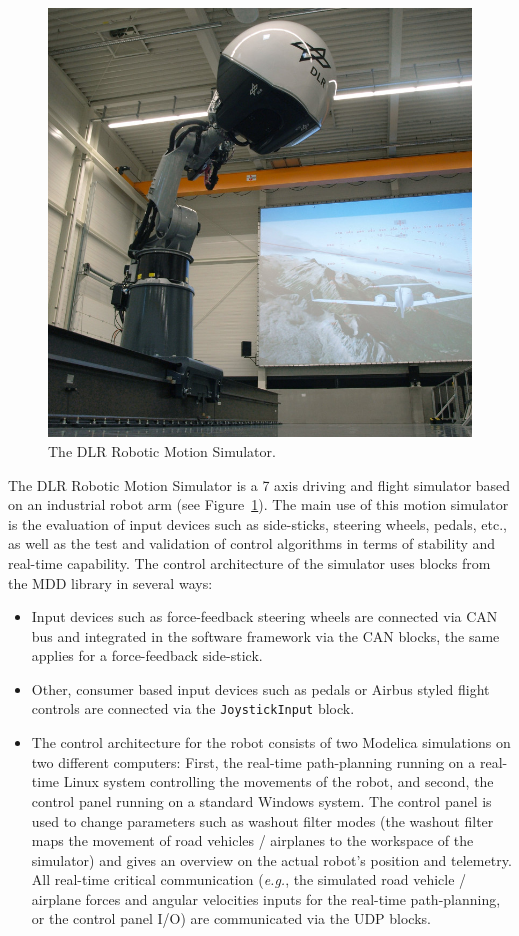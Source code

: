 \documentclass{resources/modelica}
\newcommand{\modelica}[1]{\lstinline[language=modelica]|#1|}
\begin{document}
\begin{figure}[htb]
  \centering
  \includegraphics[width=0.9\columnwidth]{figures/DLRRoboticMotionSimulator}
  \caption{The DLR Robotic Motion Simulator.}
  \label{fig:DLRRoboticMotionSimulator}
\end{figure}

\noindent
The DLR Robotic Motion Simulator \citep{bellmann2011dlr} is a 7 axis driving and
flight simulator based on an industrial robot arm (see
Figure~\ref{fig:DLRRoboticMotionSimulator}). The main use of this motion
simulator is the evaluation of input devices such as side-sticks, steering
wheels, pedals, etc., as well as the test and validation of control algorithms
in terms of stability and real-time capability. The control architecture of the
simulator uses blocks from the MDD library in several ways:
\begin{itemize}
  \item Input devices such as force-feedback steering wheels are connected via CAN bus
and integrated in the software framework via the CAN blocks, the same
applies for a force-feedback side-stick.
  \item Other, consumer based input devices such as pedals or Airbus styled flight
controls are connected via the \modelica{JoystickInput} block.
  \item The control architecture for the robot consists of two Modelica simulations on
two different computers: First, the real-time path-planning running on a
real-time Linux system controlling the movements of the robot, and second, the
control panel running on a standard Windows system. The control panel is used to
change parameters such as washout filter modes (the washout filter maps the
movement of road vehicles / airplanes to the workspace of the simulator) and
gives an overview on the actual robot's position and telemetry. All real-time critical
communication (\textit{e.g.}, the simulated road vehicle / airplane forces and
angular velocities inputs for the real-time path-planning, or the control panel
I/O) are communicated via the UDP blocks.
\end{itemize}
\end{document}

